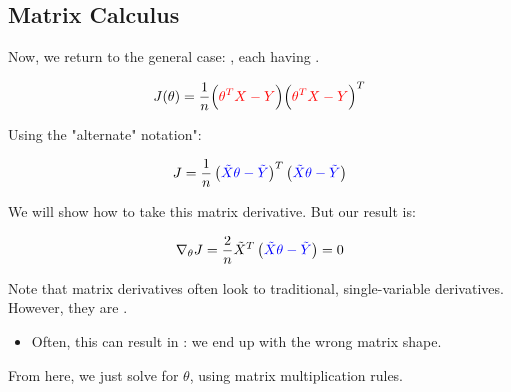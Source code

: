     \subsection{Matrix Calculus}

        Now, we return to the general case: , each having .

        \begin{equation*}
            J(\theta) = \frac{1}{n}
                \Big( \textcolor{red}{ \theta^T X - Y} \Big)
                \Big( \textcolor{red}{ \theta^T X - Y} \Big)^T
        \end{equation*}

        Using the "alternate" notation":
        
        \begin{equation}
            J = \frac{1}{n}
                \left( \textcolor{blue}{ \tilde{X} \theta  - \tilde{Y} } \right)^T
                \left( \textcolor{blue}{ \tilde{X} \theta  - \tilde{Y} } \right) 
        \end{equation}
        
        We will  show how to take this matrix derivative. But our result is:

        \begin{equation}
            \nabla_\theta J = 
                \frac{2}{n} \tilde{X}^T
                \left( \textcolor{blue}{ \tilde{X} \theta  - \tilde{Y} } \right) 
            =0
        \end{equation}

        \begin{clarification}
            Note that matrix derivatives often look  to traditional, single-variable derivatives. However, they are .

            \begin{itemize}
                \item Often, this can result in : we end up with the wrong matrix shape.
            \end{itemize}
        \end{clarification}

        
        
        From here, we just solve for $\theta$, using matrix multiplication rules.\\
        
